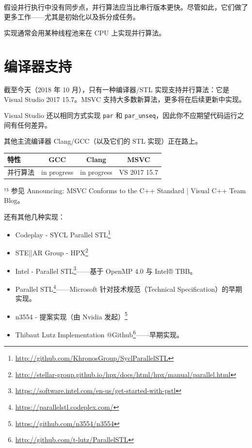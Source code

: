 假设并行执行中没有同步点，并行算法应当比串行版本更快。尽管如此，它们做了更多工作——尤其是初始化以及拆分成任务。

实现通常会用某种线程池来在 CPU 上实现并行算法。


\section{编译器支持}

截至今天（2018 年 10 月），只有一种编译器/STL 实现支持并行算法：它是 Visual Studio 2017 15.7。MSVC 支持大多数新算法，更多将在后续更新中实现。

Visual Studio 还以相同方式实现 \texttt{par} 和 \texttt{par\_unseq}，因此你不应期望代码运行之间有任何差异。

其他主流编译器 Clang/GCC（以及它们的 STL 实现）正在路上。

\begin{table}[H]
\centering
\begin{tabularx}{\textwidth}{X c c c}
\toprule
特性 & GCC & Clang & MSVC \\
\midrule
并行算法 & in progress & in progress & VS 2017 15.7 \\
\bottomrule
\end{tabularx}
\end{table}

¹⁵ 参见 Announcing: MSVC Conforms to the C++ Standard | Visual C++ Team Blog。

还有其他几种实现：
\begin{itemize}
\item Codeplay - SYCL Parallel STL\footnote{\url{http://github.com/KhronosGroup/SyclParallelSTL}}
\item STE||AR Group - HPX\footnote{\url{http://stellar-group.github.io/hpx/docs/html/hpx/manual/parallel.html}}
\item Intel - Parallel STL\footnote{\url{https://software.intel.com/en-us/get-started-with-pstl}}——基于 OpenMP 4.0 与 Intel® TBB。
\item Parallel STL\footnote{\url{https://parallelstl.codeplex.com/}}——Microsoft 针对技术规范（Technical Specification）的早期实现。
\item n3554 - 提案实现（由 Nvidia 发起）\footnote{\url{https://github.com/n3554/n3554}}
\item Thibaut Lutz Implementation @Github\footnote{\url{http://github.com/t-lutz/ParallelSTL}}——早期实现。
\end{itemize}
